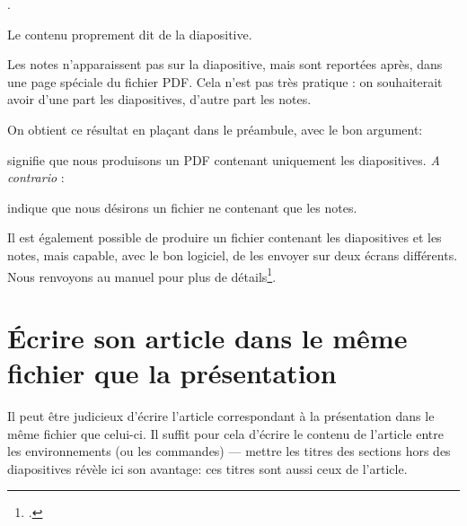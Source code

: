 \begin{latexcode}
\begin{frame}
.
    
Le contenu proprement dit de la diapositive.
\end{frame}
\end{latexcode}


Les notes n'apparaissent pas sur la diapositive, mais sont reportées après, dans une page spéciale du fichier PDF. Cela n'est pas très pratique : on souhaiterait avoir d'une part les diapositives, d'autre part les notes. 

On obtient ce résultat en plaçant  dans le préambule, avec le bon argument:

\begin{latexcode}
\end{latexcode}

signifie que nous produisons un PDF contenant uniquement les diapositives. \emph{A contrario} :

\begin{latexcode}
\end{latexcode}

indique que nous désirons un fichier ne contenant que les notes.

\begin{plusloins}
Il est également possible de produire un fichier contenant les diapositives et les notes, mais capable, avec le bon logiciel, de les envoyer sur deux écrans différents. Nous renvoyons au manuel pour plus de détails\footcite{beamer_2ecrans}.
\end{plusloins}

\section{Écrire son article dans le même fichier que la présentation}

Il peut être judicieux d'écrire l'article correspondant à la présentation dans le même fichier que celui-ci. Il suffit pour cela d'écrire le contenu de l'article entre les environnements (ou les commandes)  ---  mettre les titres des sections hors des diapositives révèle ici son avantage: ces titres sont aussi ceux de l'article.

